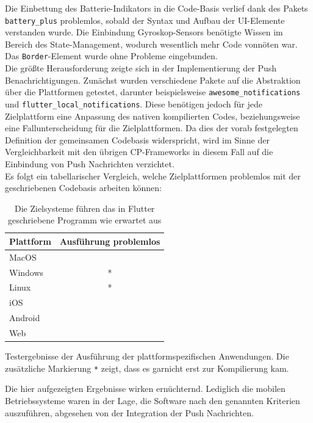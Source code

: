 \documentclass[a4paper]{scrartcl}
\newcommand{\xmark}{\ding{55}}
\begin{document}
Die Einbettung des Batterie-Indikators in die Code-Basis verlief dank des Pakets \texttt{battery\_plus} problemlos, sobald der Syntax und Aufbau der UI-Elemente verstanden wurde. Die Einbindung Gyroskop-Sensors benötigte Wissen im Bereich des State-Management, wodurch wesentlich mehr Code vonnöten war. Das \texttt{Border}-Element wurde ohne Probleme eingebunden. \\
Die größte Herausforderung zeigte sich in der Implementierung der Push Benachrichtigungen. Zunächst wurden verschiedene Pakete auf die Abstraktion über die Plattformen getestet, darunter beispielsweise \texttt{awesome\_notifications} und \texttt{flutter\_local\_notifications}. Diese benötigen jedoch für jede Zielplattform eine Anpassung des nativen kompilierten Codes, beziehungsweise eine Fallunterscheidung für die Zielplattformen. Da dies der vorab festgelegten Definition der gemeinsamen Codebasis widerspricht, wird im Sinne der Vergleichbarkeit mit den übrigen CP-Frameworks in diesem Fall auf die Einbindung von Push Nachrichten verzichtet. \\

Es folgt ein tabellarischer Vergleich, welche Zielplattformen problemlos mit der geschriebenen Codebasis arbeiten können:

\begin{table}[H]
 	\centering
 	\caption{Die Zielsysteme führen das in Flutter geschriebene Programm wie erwartet aus}
 	\begin{center}
 		\begin{tabular}{| l | c |}
 			\hline
 			\textbf{Plattform} & \textbf{Ausführung problemlos} \\
 			\hline \hline
			MacOS & \xmark \\
 			\hline
 			Windows & \xmark * \\
 			\hline
 			Linux & \xmark * \\
 			\hline
 			iOS & \Checkmark \\
 			\hline
 			Android & \Checkmark \\
 			\hline
 			Web & \xmark \\
 			\hline
 		\end{tabular}
 	\end{center}
 	Testergebnisse der Ausführung der plattformspezifischen Anwendungen. Die zusätzliche Markierung \texttt{*} zeigt, dass es garnicht erst zur Kompilierung kam.
\end{table}

Die hier aufgezeigten Ergebnisse wirken ernüchternd. Lediglich die mobilen Betriebssysteme waren in der Lage, die Software nach den genannten Kriterien auszuführen, abgesehen von der Integration der Push Nachrichten. \\
\end{document}
